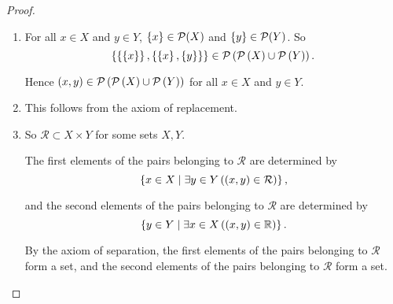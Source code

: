\begin{proof}
    \begin{enumerate}[label={(\alph*)}]
        \item For all $x\in X$ and $y\in Y$, $\left\{{x}\right\}\in \mathcal{P}(X)$ and $\left\{{y}\right\}\in \mathcal{P}(Y)$. So
              \[
                  \left\{{\left\{{\left\{{x}\right\}}\right\}, \left\{{\left\{{x}\right\}, \left\{{y}\right\}}\right\}}\right\}\in \mathcal{P}\left({\mathcal{P}\left({X}\right)\cup\mathcal{P}\left({Y}\right)}\right).
              \]

              Hence $(x, y)\in \mathcal{P}\left({\mathcal{P}\left({X}\right)\cup\mathcal{P}\left({Y}\right)}\right)$ for all $x\in X$ and $y\in Y$.
        \item This follows from the axiom of replacement.
        \item So $\mathcal{R}\subset X\times Y$ for some sets $X, Y$.

              The first elements of the pairs belonging to $\mathcal{R}$ are determined by
              \[
                  \left\{{x\in X \mid \exists y\in Y \left( (x, y)\in \mathcal{R} \right) }\right\},
              \]

              and the second elements of the pairs belonging to $\mathcal{R}$ are determined by
              \[
                  \left\{{y\in Y \mid \exists x\in X\left( (x, y)\in \mathbb{R} \right)}\right\}.
              \]

              By the axiom of separation, the first elements of the pairs belonging to $\mathcal{R}$ form a set, and the second elements of the pairs belonging to $\mathcal{R}$ form a set.
    \end{enumerate}
\end{proof}
\newpage

